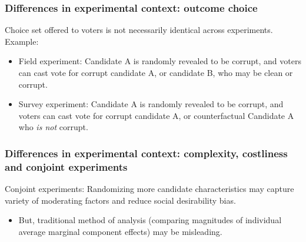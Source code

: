 \documentclass[usenames,dvipsnames]{beamer}
\begin{document}
\begin{frame}
\frametitle{Differences in experimental context: outcome choice}
Choice set offered to voters is not necessarily identical across experiments. Example:

\begin{itemize}
\item Field experiment: Candidate A is randomly revealed to be corrupt, and voters can cast vote for corrupt candidate A, or candidate B, who may be clean or corrupt. 
\vspace{0.5cm}
\item Survey experiment: Candidate A is randomly revealed to be corrupt, and voters can cast vote for corrupt candidate A, or counterfactual Candidate A who \textit{is not} corrupt. 

\end{itemize}

\end{frame}

\begin{frame}
\frametitle{Differences in experimental context: complexity, costliness and conjoint experiments}
\textcolor{Cerulean}{Conjoint experiments}: Randomizing more candidate characteristics may capture variety of moderating factors and reduce social desirability bias.
\begin{itemize}
\pause
\item But, traditional method of analysis (comparing magnitudes of individual average marginal component effects) may be misleading. 
\end{itemize}

\end{frame}
\end{document}
